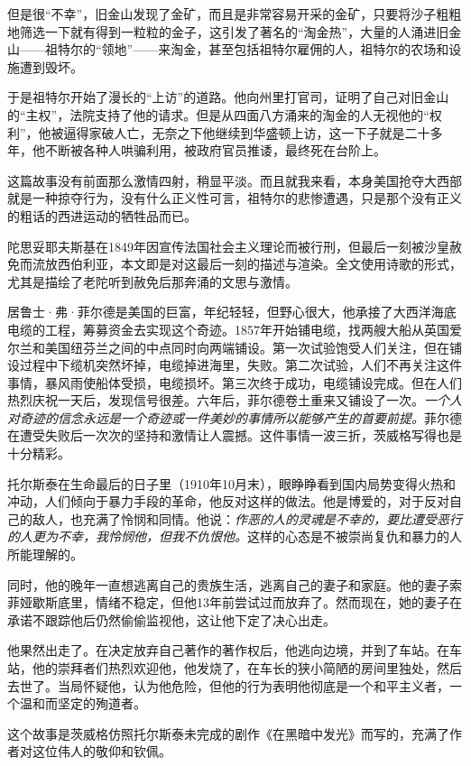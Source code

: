 \begin{itemize*}
但是很“不幸”，旧金山发现了金矿，而且是非常容易开采的金矿，只要将沙子粗粗地筛选一下就有得到一粒粒的金子，这引发了著名的“淘金热”，大量的人涌进旧金山——祖特尔的“领地”——来淘金，甚至包括祖特尔雇佣的人，祖特尔的农场和设施遭到毁坏。

于是祖特尔开始了漫长的“上访”的道路。他向州里打官司，证明了自己对旧金山的“主权”，法院支持了他的请求。但是从四面八方涌来的淘金的人无视他的“权利”，他被逼得家破人亡，无奈之下他继续到华盛顿上访，这一下子就是二十多年，他不断被各种人哄骗利用，被政府官员推诿，最终死在台阶上。

这篇故事没有前面那么激情四射，稍显平淡。而且就我来看，本身美国抢夺大西部就是一种掠夺行为，没有什么正义性可言，祖特尔的悲惨遭遇，只是那个没有正义的粗话的西进运动的牺牲品而已。
	\item 陀思妥耶夫斯基在1849年因宣传法国社会主义理论而被行刑，但最后一刻被沙皇赦免而流放西伯利亚，本文即是对这最后一刻的描述与渲染。全文使用诗歌的形式，尤其是描绘了老陀听到赦免后那奔涌的文思与激情。
	\item 居鲁士·弗·菲尔德是美国的巨富，年纪轻轻，但野心很大，他承接了大西洋海底电缆的工程，筹募资金去实现这个奇迹。1857年开始铺电缆，找两艘大船从英国爱尔兰和美国纽芬兰之间的中点同时向两端铺设。第一次试验饱受人们关注，但在铺设过程中下缆机突然坏掉，电缆掉进海里，失败。第二次试验，人们不再关注这件事情，暴风雨使船体受损，电缆损坏。第三次终于成功，电缆铺设完成。但在人们热烈庆祝一天后，发现信号很差。六年后，菲尔德卷土重来又铺设了一次。\emph{一个人对奇迹的信念永远是一个奇迹或一件美妙的事情所以能够产生的首要前提。}菲尔德在遭受失败后一次次的坚持和激情让人震撼。这件事情一波三折，茨威格写得也是十分精彩。
	\item 托尔斯泰在生命最后的日子里（1910年10月末），眼睁睁看到国内局势变得火热和冲动，人们倾向于暴力手段的革命，他反对这样的做法。他是博爱的，对于反对自己的敌人，也充满了怜悯和同情。他说：\emph{作恶的人的灵魂是不幸的，要比遭受恶行的人更为不幸，我怜悯他，但我不仇恨他。}这样的心态是不被崇尚复仇和暴力的人所能理解的。

同时，他的晚年一直想逃离自己的贵族生活，逃离自己的妻子和家庭。他的妻子索菲娅歇斯底里，情绪不稳定，但他13年前尝试过而放弃了。然而现在，她的妻子在承诺不跟踪他后仍然偷偷监视他，这让他下定了决心出走。

他果然出走了。在决定放弃自己著作的著作权后，他逃向边境，并到了车站。在车站，他的崇拜者们热烈欢迎他，他发烧了，在车长的狭小简陋的房间里独处，然后去世了。当局怀疑他，认为他危险，但他的行为表明他彻底是一个和平主义者，一个温和而坚定的殉道者。

这个故事是茨威格仿照托尔斯泰未完成的剧作《在黑暗中发光》而写的，充满了作者对这位伟人的敬仰和钦佩。


\end{itemize*}
